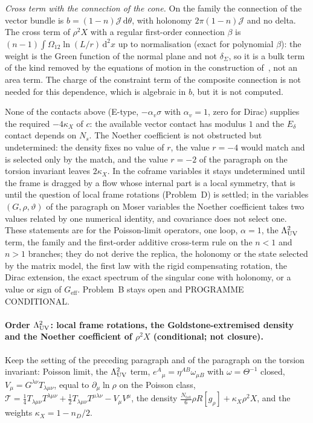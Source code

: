\emph{Cross term with the connection of the cone.} On the family the connection of the vector bundle is \(b=(1-n)\mathcal J\,\mathrm d\theta\), with holonomy \(2\pi(1-n)\mathcal J\) and no delta. The cross term of \(\rho^2X\) with a regular first-order connection \(\beta\) is \((n-1)\int\Omega_{12}\ln(L/r)\,\mathrm d^2x\) up to normalisation (exact for polynomial \(\beta\)): the weight is the Green function of the normal plane and not \(\delta_\Sigma\), so it is a bulk term of the kind removed by the equations of motion in the construction of~\cite{LewkowyczMaldacena2013}, not an area term. The charge of the constraint term of the composite connection is not needed for this dependence, which is algebraic in \(b\), but it is not computed.

None of the contacts above (E-type, \(-\alpha_v\sigma\) with \(\alpha_v=1\), zero for Dirac) supplies the required \(-4\kappa_X\) of \(c\): the available vector contact has modulus \(1\) and the \(E_\delta\) contact depends on \(N_s\). The Noether coefficient is not obstructed but undetermined: the density fixes no value of \(r\), the value \(r=-4\) would match and is selected only by the match, and the value \(r=-2\) of the paragraph on the torsion invariant leaves \(2\kappa_X\). In the coframe variables it stays undetermined until the frame is dragged by a flow whose internal part is a local symmetry, that is until the question of local frame rotations (Problem~D) is settled; in the variables \((G,\rho,\vartheta)\) of the paragraph on Moser variables the Noether coefficient takes two values related by one numerical identity, and covariance does not select one. These statements are for the Poisson-limit operators, one loop, \(\alpha=1\), the \(\Lambda_{\mathrm{UV}}^2\) term, the family and the first-order additive cross-term rule on the \(n<1\) and \(n>1\) branches; they do not derive the replica, the holonomy or the state selected by the matrix model, the first law with the rigid compensating rotation, the Dirac extension, the exact spectrum of the singular cone with holonomy, or a value or sign of \(G_{\mathrm{eff}}\). Problem~B stays open and PROGRAMME CONDITIONAL.

\paragraph{Order \(\Lambda_{\mathrm{UV}}^2\): local frame rotations, the Goldstone-extremised density and the Noether coefficient of \(\rho^2X\) (conditional; not closure).}
Keep the setting of the preceding paragraph and of the paragraph on the torsion invariant: Poisson limit, the \(\Lambda_{\mathrm{UV}}^2\) term, \(e^A{}_\mu=\eta^{AB}\omega_{\mu B}\) with \(\omega=\Theta^{-1}\) closed, \(V_\mu=G^{\lambda\nu}T_{\lambda\mu\nu}\), equal to \(\partial_\mu\ln\rho\) on the Poisson class, \(\mathcal T=\tfrac14T_{\lambda\mu\nu}T^{\lambda\mu\nu}+\tfrac12T_{\lambda\mu\nu}T^{\mu\lambda\nu}-V_\mu V^\mu\), the density \(\tfrac{N_{\mathrm{tot}}}6\rho R[g_\rho]+\kappa_X\rho^2X\), and the weights \(\kappa_X=1-n_D/2\).

